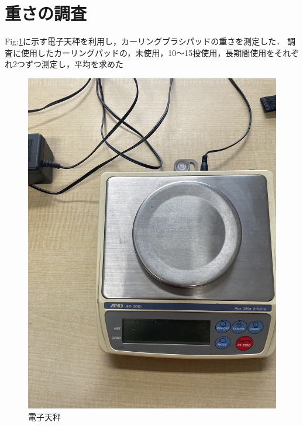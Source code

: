 \documentclass[main]{subfiles}
\begin{document}
\section{重さの調査}
Fig:\ref{fig:aiueo}に示す電子天秤を利用し，カーリングブラシパッドの重さを測定した．
調査に使用したカーリングパッドの，未使用，10～15投使用，長期間使用をそれぞれ2つずつ測定し，平均を求めた
\begin{figure}[htbp]
    \centering
    \includegraphics[width=0.5\linewidth, height=0.6\linewidth]{figures/denshitenbinn.jpg}
    \caption{電子天秤}
    \label{fig:aiueo}
\end{figure}
\end{document}
